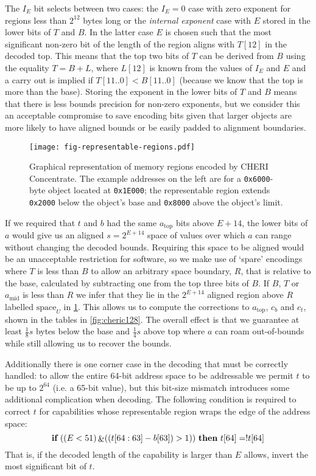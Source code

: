 The $I_E$ bit selects between two cases: the $I_E = 0$ case with zero
exponent for regions less than $2^{12}$ bytes long or the
\emph{internal exponent} case with $E$ stored in the lower bits of $T$
and $B$.  In the latter case $E$ is chosen such that the most
significant non-zero bit of the length of the region aligns
with $T[12]$ in the decoded top.  This means that the top two bits of
$T$ can be derived from $B$ using the equality $T = B + L$, where
$L[12]$ is known from the values of $I_E$ and $E$ and a carry out is
implied if $T[11..0] < B[11..0]$ (because we know that the top is more
than the base).  Storing the exponent in the lower bits of $T$ and $B$
means that there is less bounds precision for non-zero exponents, but
we consider this an acceptable compromise to save encoding bits given
that larger objects are more likely to have aligned bounds or be
easily padded to alignment boundaries.

\begin{figure}[tb]\footnotesize
\centering
\texttt{[image: fig-representable-regions.pdf]}
\caption{Graphical representation of memory regions encoded by CHERI Concentrate.  The example
addresses on the left are for a \texttt{0x6000}-byte object located at \texttt{0x1E000};
the representable region extends \texttt{0x2000} below the object's base and \texttt{0x8000}
above the object's limit.}
\label{fig:ccregions}
\end{figure}

If we required that $t$ and $b$ had the same $a_\text{top}$ bits above $E + 14$, the lower bits of $a$ would give us an aligned $s = 2^{E+14}$ space of values over which $a$ can range without changing the decoded bounds.
Requiring this space to be aligned would be an unacceptable restriction for software, so we make use of `spare' encodings where $T$ is less than $B$ to allow an arbitrary space boundary, $R$, that is relative to the base, calculated by subtracting one from the top three bits of $B$.
If $B$, $T$ or $a_\text{mid}$ is less than $R$ we infer that they lie in the $2^{E+14}$ aligned region above $R$ labelled $\text{space}_U$ in \cref{fig:ccregions}.
This allows us to compute the corrections to $a_\text{top}$, $c_b$ and $c_t$, shown in the tables in \cref{fig:cheric128}.
The overall effect is that we guarantee at least $ \frac{1}{8} s$ bytes below the base and $ \frac{1}{4} s $ above top where $a$ can roam out-of-bounds while still allowing us to recover the bounds.

Additionally there is one corner case in the decoding that must be correctly handled:
to allow the entire 64-bit address space to be addressable we permit $t$ to be up to $2^{64}$ (i.e. a 65-bit value), but this bit-size mismatch introduces some additional complication when decoding.
The following condition is required to correct $t$ for capabilities whose representable region wraps the edge of the address space:
\[ \algorithmicif\ ((E<51) \mathop{\&} ((t[64:63]-b[63]) > 1))\ \algorithmicthen\ t[64] = !t[64]\]
That is, if the decoded length of the capability is larger than $E$ allows, invert the most significant bit of $t$.


